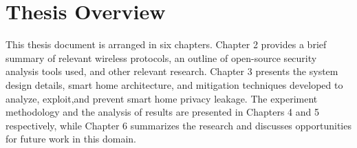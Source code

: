 \documentclass[12pt,letterpaper,oneside]{book}
\begin{document}
		\section{Thesis Overview}
		This thesis document is arranged in six chapters. Chapter 2 provides a brief summary of relevant wireless protocols, an outline of open-source security analysis tools used, and other relevant research. Chapter 3 presents the system design details, smart home architecture, and mitigation techniques developed to analyze, exploit,and prevent smart home privacy leakage. The experiment methodology and the analysis of results are presented in Chapters 4 and 5 respectively, while Chapter 6 summarizes the research and discusses opportunities for future work in this domain.
		
		
	\todos
\backmatter
	\singlespace
	
	 
	\clearpage
\end{document}
